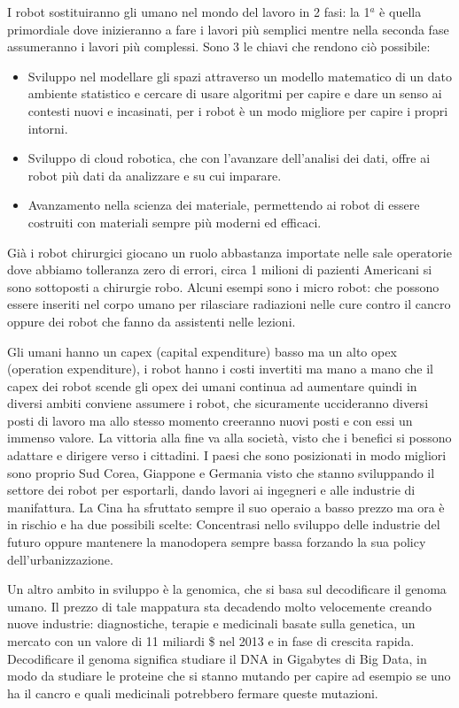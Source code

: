 \documentclass[]{article}
\begin{document}
I robot sostituiranno gli umano nel mondo del lavoro in 2 fasi: la 1$^a$ è
quella primordiale dove inizieranno a fare i lavori più semplici mentre
nella seconda fase assumeranno i lavori più complessi. Sono 3 le chiavi
che rendono ciò possibile:

\begin{itemize}
	 
	\item
	Sviluppo nel modellare gli spazi attraverso un modello matematico di
	un dato ambiente statistico e cercare di usare algoritmi per capire e
	dare un senso ai contesti nuovi e incasinati, per i robot è un modo
	migliore per capire i propri intorni.
	\item
	Sviluppo di cloud robotica, che con l'avanzare dell'analisi dei dati,
	offre ai robot più dati da analizzare e su cui imparare.
	\item
	Avanzamento nella scienza dei materiale, permettendo ai robot di
	essere costruiti con materiali sempre più moderni ed efficaci.
\end{itemize}

Già i robot chirurgici giocano un ruolo abbastanza importate nelle sale
operatorie dove abbiamo tolleranza zero di errori, circa 1 milioni di
pazienti Americani si sono sottoposti a chirurgie robo. Alcuni esempi
sono i micro robot: che possono essere inseriti nel corpo umano per
rilasciare radiazioni nelle cure contro il cancro oppure dei robot che
fanno da assistenti nelle lezioni.

Gli umani hanno un capex (capital expenditure) basso ma un alto opex
(operation expenditure), i robot hanno i costi invertiti ma mano a mano
che il capex dei robot scende gli opex dei umani continua ad aumentare
quindi in diversi ambiti conviene assumere i robot, che sicuramente
uccideranno diversi posti di lavoro ma allo stesso momento creeranno
nuovi posti e con essi un immenso valore. La vittoria alla fine va alla
società, visto che i benefici si possono adattare e dirigere verso i
cittadini. I paesi che sono posizionati in modo migliori sono proprio
Sud Corea, Giappone e Germania visto che stanno sviluppando il settore
dei robot per esportarli, dando lavori ai ingegneri e alle industrie di
manifattura. La Cina ha sfruttato sempre il suo operaio a basso prezzo
ma ora è in rischio e ha due possibili scelte: Concentrasi nello
sviluppo delle industrie del futuro oppure mantenere la manodopera
sempre bassa forzando la sua policy dell'urbanizzazione.

Un altro ambito in sviluppo è la genomica, che si basa sul decodificare
il genoma umano. Il prezzo di tale mappatura sta decadendo molto
velocemente creando nuove industrie: diagnostiche, terapie e medicinali
basate sulla genetica, un mercato con un valore di 11 miliardi \$ nel
2013 e in fase di crescita rapida. Decodificare il genoma significa
studiare il DNA in Gigabytes di Big Data, in modo da studiare le
proteine che si stanno mutando per capire ad esempio se uno ha il cancro
e quali medicinali potrebbero fermare queste mutazioni.
\end{document}
